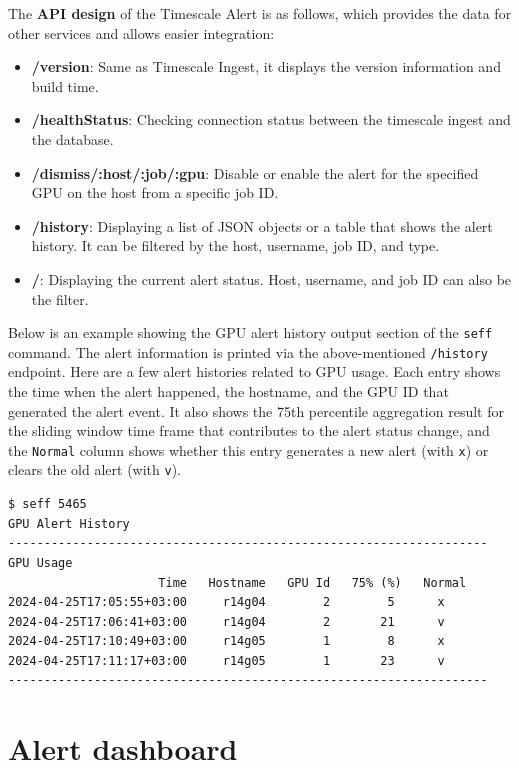 The \textbf{API design} of the Timescale Alert is as follows, which provides the data for other services and allows easier integration:

\begin{itemize}
    \item \textbf{/version}: Same as Timescale Ingest, it displays the version information and build time.
    \item \textbf{/healthStatus}: Checking connection status between the timescale ingest and the database.
    \item \textbf{/dismiss/:host/:job/:gpu}: Disable or enable the alert for the specified GPU on the host from a specific job ID.
    \item \textbf{/history}: Displaying a list of JSON objects or a table that shows the alert history. It can be filtered by the host, username, job ID, and type.
    \item \textbf{/}: Displaying the current alert status. Host, username, and job ID can also be the filter.
\end{itemize}

Below is an example showing the GPU alert history output section of the \texttt{seff} command. The alert information is printed via the above-mentioned \texttt{/history} endpoint. Here are a few alert histories related to GPU usage. Each entry shows the time when the alert happened, the hostname, and the GPU ID that generated the alert event. It also shows the 75th percentile aggregation result for the sliding window time frame that contributes to the alert status change, and the \texttt{Normal} column shows whether this entry generates a new alert (with \texttt{x}) or clears the old alert (with \texttt{v}).

\begin{lstlisting}
$ seff 5465
GPU Alert History
-------------------------------------------------------------------
GPU Usage
                     Time   Hostname   GPU Id   75% (%)   Normal
2024-04-25T17:05:55+03:00     r14g04        2        5      x
2024-04-25T17:06:41+03:00     r14g04        2       21      v
2024-04-25T17:10:49+03:00     r14g05        1        8      x
2024-04-25T17:11:17+03:00     r14g05        1       23      v
-------------------------------------------------------------------
\end{lstlisting}

\section{Alert dashboard}

